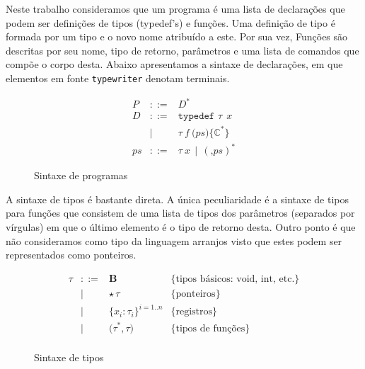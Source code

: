 \documentclass[a4paper,8pt]{article}
\begin{document}
     Neste trabalho consideramos que um programa é uma lista de
     declarações que podem ser definições de tipos (typedef's) e
     funções. Uma definição de tipo é formada por um tipo e o novo 
     nome atribuído a este. Por sua vez, Funções são descritas por seu 
     nome, tipo de retorno, parâmetros e uma lista de comandos que 
     compõe o corpo desta. Abaixo apresentamos a sintaxe de
     declarações, em que elementos em fonte \texttt{typewriter}
     denotam terminais.
     
     \begin{figure}[h]
         \[
               \begin{array}{lcl}
                   P & ::=    & D^*\\
                   D & ::=   & \texttt{typedef }\tau\:\:x\\
                      & \mid & \tau\:f\:\texttt{(}ps\texttt{)} \texttt{\{}\mathbb{C}^*\texttt{\}} \\
                   ps & ::= & \tau\:x \,\mid\,(\texttt{,}ps)^*
               \end{array}
         \]
         \centering
         \caption{Sintaxe de programas}
         \label{figprogsyn}
     \end{figure}

     A sintaxe de tipos é bastante direta. A única peculiaridade é a
     sintaxe de tipos para funções que consistem de uma lista de tipos
     dos parâmetros (separados por vírgulas) em que o último elemento
     é o tipo de retorno desta. Outro ponto é que não consideramos
     como tipo da linguagem arranjos visto que estes podem ser
     representados como ponteiros.

     \begin{figure}[h]
       \[
         \begin{array}{lcll}
           \tau & ::= & \textbf{B} & \{\text{tipos básicos: void, int,
                                     etc.}\}\\
                & \mid & \star\, \tau & \{\text{ponteiros}\} \\
                & \mid & \{x_i : \tau_i\}^{i=1..n} & \{\text{registros}\} \\
                & \mid & \texttt{(}\tau^*, \tau\texttt{)} & \{\text{tipos de funções}\}\\
         \end{array}
       \]
       \centering
       \caption{Sintaxe de tipos}
       \label{figtypesyn}
     \end{figure}
     
\end{document}
